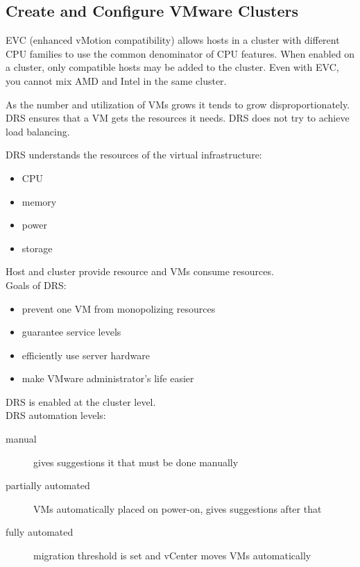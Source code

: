 \subsection{Create and Configure VMware Clusters}

EVC (enhanced vMotion compatibility) allows hosts in a cluster with different
CPU families to use the common denominator of CPU features. When enabled on a
cluster, only compatible hosts may be added to the cluster. Even with EVC,
you cannot mix AMD and Intel in the same cluster.

As the number and utilization of VMs grows it tends to grow disproportionately.
DRS ensures that a VM gets the resources it needs. DRS does not try to
achieve load balancing.

DRS understands the resources of the virtual infrastructure:

\begin{itemize}
\item CPU
\item memory
\item power
\item storage
\end{itemize}

Host and cluster provide resource and VMs consume resources.\\

Goals of DRS:

\begin{itemize}
\item prevent one VM from monopolizing resources
\item guarantee service levels
\item efficiently use server hardware
\item make VMware administrator's life easier
\end{itemize}

DRS is enabled at the cluster level.\\

DRS automation levels:

\begin{description}

\item[manual]
gives suggestions it that must be done manually

\item[partially automated]
VMs automatically placed on power-on, gives suggestions after that

\item[fully automated]
migration threshold is set and vCenter moves VMs automatically

\end{description}

